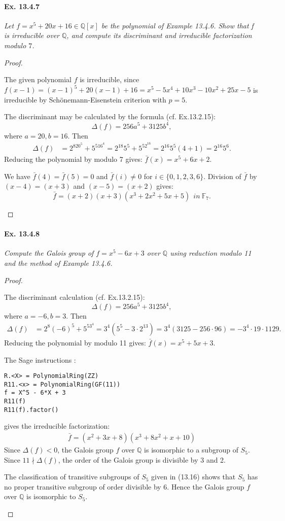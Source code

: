\documentclass[11pt,a4paper]{article}
\newcommand{\be} {\begin{enumerate}}
\newcommand{\ee} {\end{enumerate}}
\begin{document}
\paragraph{Ex. 13.4.7}

{\it Let $f=x^5+20x+16 \in \mathbb{Q}[x]$ be the polynomial of Example 13.4.6. Show that f is irreducible over $\mathbb{Q}$, and compute its discriminant and irreducible factorization modulo $7$.
\begin{proof}
\be
The given polynomial $f$ is irreducible, since $f(x-1)=(x-1)^5+20(x-1)+16=x^5-5x^4+10x^3-10x^2+25x-5$ is irreducible by Sch\"onemann-Eisenstein criterion with $p=5$.

The discriminant may be calculated by the formula (cf. Ex.13.2.15):
$$\Delta(f) = 256a^5+3125b^4,$$
where $a=20,b=16$. Then
\begin{align*}
\Delta(f) &= 2^820^5+5^516^4=2^{18}5^5+5^52^{16}=2^{16}5^5(4+1)=2^{16}5^6.
\end{align*}
Reducing the polynomial by modulo 7 gives:
$\bar f(x)=x^5+6x+2$. 

We have $\bar f(4)=\bar f(5)=0$ and $\bar f(i)\ne 0$ for $i\in \{0,1,2,3,6\}$. Division of $\bar f$ by $(x-4)=(x+3)$ and $(x-5)=(x+2)$ gives:
$$\bar f=(x+2)(x+3)(x^3+2x^2+5x+5) ~~ in~\mathbb{F}_7.$$
\ee\end{proof}
}

\paragraph{Ex. 13.4.8}

{\it Compute the Galois group of  $f=x^5-6x+3$ over $\mathbb{Q}$ using reduction modulo 11 and the method of Example 13.4.6.
\begin{proof}
\be
The discriminant calculation (cf. Ex.13.2.15):
$$\Delta(f) = 256a^5+3125b^4,$$
where $a=-6,b=3$. Then
\begin{align*}
\Delta(f) &= 2^8(-6)^5+5^53^4=3^4(5^5-3\cdot 2^{13})=3^4(3125-256\cdot96)=-3^4\cdot19\cdot1129.
\end{align*}
Reducing the polynomial by modulo 11 gives:
$\bar f(x)=x^5+5x+3$.

The Sage instructions :
\begin{verbatim}
R.<X> = PolynomialRing(ZZ)
R11.<x> = PolynomialRing(GF(11))
f = X^5 - 6*X + 3
R11(f)
R11(f).factor()
\end{verbatim}
gives the irreducible factorization:
\begin{align*}
\bar f=(x^2 + 3x + 8)(x^3 + 8x^2 + x + 10)
\end{align*}
Since $\Delta(f)<0$, the Galois group $f$ over $\mathbb{Q}$ is isomorphic to a subgroup of $S_5$. Since $11\nmid \Delta(f)$, the order of the Galois group is divisible by 3 and 2.

The classification of transitive subgroups of $S_5$ given in (13.16) shows that $S_5$ has no proper transitive subgroup of order divisible by 6. Hence the Galois group $f$ over $\mathbb{Q}$ is isomorphic to $S_5$.
\ee\end{proof}
}
\end{document}
